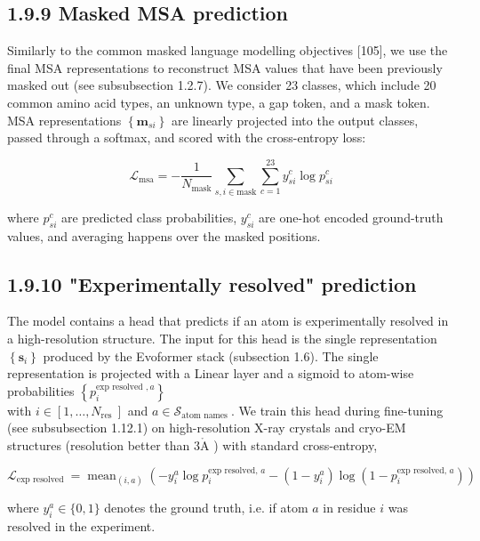 \documentclass[10pt]{article}
\def\AA{\mathring{\mathrm{A}}}
\begin{document}
\subsection*{1.9.9 Masked MSA prediction}
Similarly to the common masked language modelling objectives [105], we use the final MSA representations to reconstruct MSA values that have been previously masked out (see subsubsection 1.2.7). We consider 23 classes, which include 20 common amino acid types, an unknown type, a gap token, and a mask token. MSA representations $\left\{\mathbf{m}_{s i}\right\}$ are linearly projected into the output classes, passed through a softmax, and scored with the cross-entropy loss:


\begin{equation*}
\mathcal{L}_{\mathrm{msa}}=-\frac{1}{N_{\mathrm{mask}}} \sum_{s, i \in \mathrm{mask}} \sum_{c=1}^{23} y_{s i}^{c} \log p_{s i}^{c} \tag{42}
\end{equation*}


where $p_{s i}^{c}$ are predicted class probabilities, $y_{s i}^{c}$ are one-hot encoded ground-truth values, and averaging happens over the masked positions.

\subsection*{1.9.10 "Experimentally resolved" prediction}
The model contains a head that predicts if an atom is experimentally resolved in a high-resolution structure. The input for this head is the single representation $\left\{\mathbf{s}_{i}\right\}$ produced by the Evoformer stack (subsection 1.6). The single representation is projected with a Linear layer and a sigmoid to atom-wise probabilities $\left\{p_{i}^{\text {exp resolved }, a}\right\}$\\
with $i \in\left[1, \ldots, N_{\text {res }}\right]$ and $a \in \mathcal{S}_{\text {atom names }}$. We train this head during fine-tuning (see subsubsection 1.12.1) on high-resolution X-ray crystals and cryo-EM structures (resolution better than $3 \AA$ ) with standard cross-entropy,


\begin{equation*}
\mathcal{L}_{\text {exp resolved }}=\operatorname{mean}_{(i, a)}\left(-y_{i}^{a} \log p_{i}^{\text {exp resolved, } a}-\left(1-y_{i}^{a}\right) \log \left(1-p_{i}^{\text {exp resolved, } a}\right)\right) \tag{43}
\end{equation*}


where $y_{i}^{a} \in\{0,1\}$ denotes the ground truth, i.e. if atom $a$ in residue $i$ was resolved in the experiment.
\end{document}
